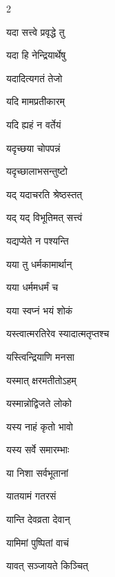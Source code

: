 \begin{multicols}{2}
\begin{indexlist}
\item यदा सत्त्वे प्रवृद्धे तु \dotfill {}
\item यदा हि नेन्द्रियार्थेषु \dotfill {}
\item यदादित्यगतं तेजो \dotfill {}
\item यदि मामप्रतीकारम् \dotfill {}
\item यदि ह्यहं न वर्तेयं \dotfill {}
\item यदृच्छया चोपपन्नं \dotfill {}
\item यदृच्छालाभसन्तुष्टो \dotfill {}
\item यद् यदाचरति श्रेष्ठस्तत् \dotfill {}
\item यद् यद् विभूतिमत् सत्त्वं \dotfill {}
\item यद्यप्येते न पश्यन्ति \dotfill {}
\item यया तु धर्मकामार्थान् \dotfill {}
\item यया धर्ममधर्मं च \dotfill {}
\item यया स्वप्नं भयं शोकं \dotfill {}
\item यस्त्वात्मरतिरेव स्यादात्मतृप्तश्च \dotfill {}
\item यस्त्विन्द्रियाणि मनसा \dotfill {}
\item यस्मात् क्षरमतीतोऽहम् \dotfill {}
\item यस्मान्नोद्विजते लोको \dotfill {}
\item यस्य नाहं कृतो भावो \dotfill {}
\item यस्य सर्वे समारम्भाः \dotfill {}
\item या निशा सर्वभूतानां \dotfill {}
\item यातयामं गतरसं \dotfill {}
\item यान्ति देवव्रता देवान् \dotfill {}
\item यामिमां पुष्पितां वाचं \dotfill {}
\item यावत् सञ्जायते किञ्चित् \dotfill {}

\end{indexlist}
\end{multicols}
